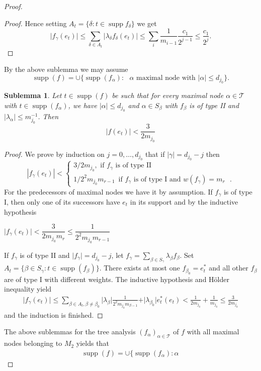 \documentclass[a4paper]{amsart}
\theoremstyle{plain}
\newtheorem{sublemma}[theorem]{Sublemma}
\newcommand{\mc}{\mathcal}
\newcommand{\fa}{f_{\alpha}}
\newcommand{\fb}{f_{\beta}}
\newcommand{\fg}{f_{\gamma}}
\newcommand{\fd}{f_{\delta}}
\DeclareMathOperator{\supp}{supp}
\begin{document}
\begin{proof}
\begin{proof}
Hence setting $A_{t}=\{\delta: t\in\supp\fd\}$ we get
$$
\vert\fg(e_t)\vert\leq \sum_{\delta \in A_{t}}\vert \lambda_{\delta}\fd(e_t)\vert\leq \sum_{i}\frac{1}{m_{i-1}}\frac{c_{1}}{2^{j-1}}\leq \frac{c_{1}}{2^{j}}.
$$\end{proof}
By the above sublemma  we may assume
$$
\supp(f)=\cup\{\supp(\fa):\text{ $\alpha$ maximal node with $\vert \alpha\vert\leq d_{j_0}$}\}.
$$
\begin{sublemma} Let $t\in\supp(f)$ be such that for every maximal node $\alpha\in\mc{T}$ with $t\in\supp(\fa)$, we have $\vert \alpha\vert\leq d_{j_0}$  and $\alpha\in S_{\beta}$ with $\fb$ is of type II and $\vert \lambda_{\alpha}\vert\leq m_{j_0}^{-1}$.  Then
$$
\vert f(e_t)\vert< \frac{3}{2m_{j_0}}
$$
\end{sublemma}
\begin{proof}
We prove  by induction on $j=0,\dots,d_{j_0}$
that if $\vert \gamma\vert =d_{j_0}-j$  then
$$|\fg(e_t)|<
\begin{cases} 3/2m_{j_0},\,\,\text{if $\fg$ is of type II}
\\
1/2^2m_{j_0}m_{r-1}\,\,\,\text{if $f_{\gamma}$ is of type I  and $w(f_\gamma)=m_{r}$ }.
\end{cases}
$$
For the predecessors of maximal nodes we have it by assumption. If $f_\gamma$ is of type
I, then only one of its successors have $e_t$ in its support and by the inductive
hypothesis
\begin{center}
$\vert f_\gamma(e_t)\vert<  \dfrac{3}{2m_{j_0} m_{r}}\leq \dfrac{1}{2^2m_{j_0}m_{r-1}}$
\end{center}
If $\fg$ is of type II and $\vert \fg\vert=d_{j_0}-j$, let $\fg=\sum_{\beta\in
S_{\gamma}}\lambda_\beta f_\beta$. Set  $A_{t}=\{\beta\in S_{\gamma}: t\in\supp(\fb)\}$.
There exists at most one  $f_{\beta_0}=e_t^*$ and  all other $f_\beta$ are of type I with
different weights. The  inductive hypothesis and H\"older inequality yield
\begin{align*}
\vert f_{\gamma} (e_t)\vert
 \leq   \sum_{\beta\in  A_{t}, \beta\neq\beta_0}\vert \lambda_\beta \vert
\frac{1}{2^2m_{j_0}m_{\beta-1}}+\vert\lambda_{\beta_0}\vert e_t^*(e_t)
<\frac{1}{2m_{j_0}}+\frac{1}{m_{j_0}}\leq\frac{3}{2m_{j_0}}
\end{align*}
and the induction is finished.
\end{proof}
The above sublemmas  for the tree analysis $(\fa)_{\alpha\in\mc{T}}$ of $f$ with all maximal nodes belonging to $M_{2}$ yields that
\begin{align}
\supp(f)=\cup\{\supp(\fa):\alpha\,

\end{align}
\end{proof}
\end{document}
